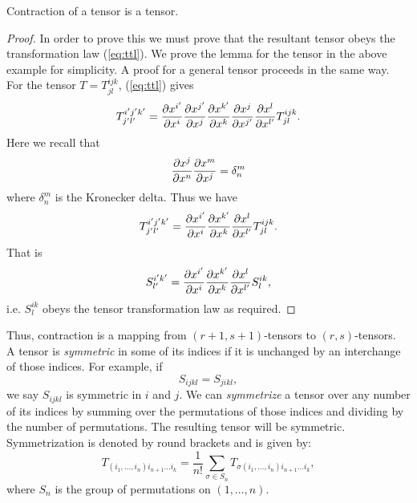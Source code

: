 \begin{lemma}
Contraction of a tensor is a tensor.
\end{lemma}
\begin{proof}
In order to prove this we must prove that the resultant tensor obeys the
transformation law (\ref{eq:ttl}). We prove the lemma for the tensor in the
above example for simplicity. A proof for a general tensor proceeds in the same
way. \\

For the tensor $T=T^{ijk}_{jl}$, (\ref{eq:ttl}) gives
\[T^{i'j'k'}_{j'l'}=\frac{{\partial} x^{i'}}{{\partial} x^i}\frac{{\partial} x^{j'}}{{\partial}
x^j}\frac{{\partial} x^{k'}}{{\partial} x^k}\frac{{\partial} x^{j}}{{\partial} x^{j'}}\frac{{\partial} x^{l}}{{\partial}
x^{l'}}T^{ijk}_{jl}. \]
Here we recall that 
\[ \frac{{\partial} x^{j}}{{\partial} x^n}\frac{{\partial} x^{m}}{{\partial} x^j}=\delta^m_n \]
where $\delta^m_n$ is the Kronecker delta. Thus we have 
\[T^{i'j'k'}_{j'l'}=\frac{{\partial} x^{i'}}{{\partial} x^i}\frac{{\partial} x^{k'}}{{\partial}
x^k}\frac{{\partial} x^{l}}{{\partial} x^{l'}}T^{ijk}_{jl}.\]
That is
\[S^{i'k'}_{l'}=\frac{{\partial} x^{i'}}{{\partial} x^i}\frac{{\partial} x^{k'}}{{\partial} x^k}\frac{{\partial}
x^{l}}{{\partial} x^{l'}}S^{ik}_{l}, \]
i.e. $S^{ik}_{l}$ obeys the tensor transformation law as required.
\end{proof}
Thus, contraction is a mapping from $(r+1,s+1)$-tensors to $(r,s)$-tensors. \\

A tensor is \textit{symmetric} in some of its indices if it is unchanged by an
interchange of those indices. For example, if 
\[ S_{ijkl}=S_{jikl},\]
we say $S_{ijkl}$ is symmetric in $i$ and $j$. We can \textit{symmetrize} a
tensor over any number of its indices by summing over the permutations of those
indices and dividing by the number of permutations. The resulting tensor will be
symmetric. Symmetrization is denoted by round brackets and is given by:
\begin{equation} T_{(i_1,\dots,i_n)i_{n+1}\dots i_k} = \frac{1}{n!}\sum_{\sigma
\in S_n}T_{\sigma(i_1,\dots,i_n)i_{n+1}\dots i_k}, \label{eq:symmetrization}
\end{equation}
where $S_n$ is the group of permutations on $(1,\dots,n)$. \\

